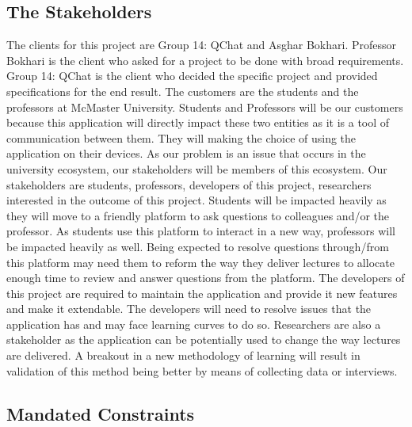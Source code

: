 \documentclass[12pt, titlepage]{article}
\begin{document}
\subsection{The Stakeholders}

The clients for this project are Group 14: QChat and Asghar Bokhari. Professor Bokhari is the client who asked for a project to be done with broad requirements. Group 14: QChat is the client who decided the specific project and provided specifications for the end result. The customers are the students and the professors at McMaster University. Students and Professors will be our customers because this application will directly impact these two entities as it is a tool of communication between them. They will making the choice of using the application on their devices. As our problem is an issue that occurs in the university ecosystem, our stakeholders will be members of this ecosystem. Our stakeholders are students, professors, developers of this project, researchers interested in the outcome of this project. Students will be impacted heavily as they will move to a friendly platform to ask questions to colleagues and/or the professor. As students use this platform to interact in a new way, professors will be impacted heavily as well. Being expected to resolve questions through/from this platform may need them to reform the way they deliver lectures to allocate enough time to review and answer questions from the platform. The developers of this project are required to maintain the application and provide it new features and make it extendable. The developers will need to resolve issues that the application has and may face learning curves to do so. Researchers are also a stakeholder as the application can be potentially used to change the way lectures are delivered. A breakout in a new methodology of learning will result in validation of this method being better by means of collecting data or interviews. 

\subsection{Mandated Constraints}
\end{document}
